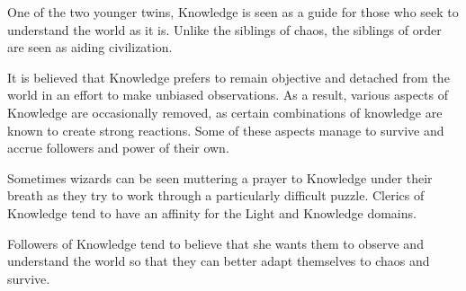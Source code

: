 One of the two younger twins, Knowledge is seen as a guide for those who seek to understand the world as it is.
Unlike the siblings of chaos, the siblings of order are seen as aiding civilization.

It is believed that Knowledge prefers to remain objective and detached from the world in an effort to make unbiased observations.
As a result, various aspects of Knowledge are occasionally removed, as certain combinations of knowledge are known to create strong reactions.
Some of these aspects manage to survive and accrue followers and power of their own.

Sometimes wizards can be seen muttering a prayer to Knowledge under their breath as they try to work through a particularly difficult puzzle.
Clerics of Knowledge tend to have an affinity for the Light and Knowledge domains.

Followers of Knowledge tend to believe that she wants them to observe and understand the world so that they can better adapt themselves to chaos and survive.
